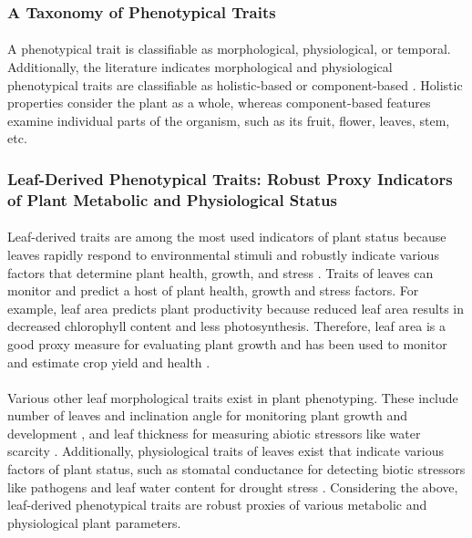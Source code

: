 \subsubsection{A Taxonomy of Phenotypical Traits}
\paragraph{}
A phenotypical trait is classifiable as morphological, physiological, or temporal. Additionally, the literature indicates morphological and physiological phenotypical traits are classifiable as holistic-based or component-based \cite{daschoudhuryLeveragingImageAnalysis2019}. Holistic properties consider the plant as a whole, whereas component-based features examine individual parts of the organism, such as its fruit, flower, leaves, stem, etc. 

\subsubsection{Leaf-Derived Phenotypical Traits: Robust Proxy Indicators of Plant Metabolic and Physiological Status}
\paragraph{}
Leaf-derived traits are among the most used indicators of plant status because leaves rapidly respond to environmental stimuli and robustly indicate various factors that determine plant health, growth, and stress \cite{zhangHighthroughputPhenotypingPlant2023}. Traits of leaves can monitor and predict a host of plant health, growth and stress factors. For example, leaf area predicts plant productivity because reduced leaf area results in decreased chlorophyll content and less photosynthesis. Therefore, leaf area is a good proxy measure for evaluating plant growth and has been used to monitor and estimate crop yield and health \cite{zhangLeafAreaIndex2021}.

\paragraph{}
Various other leaf morphological traits exist in plant phenotyping. These include number of leaves  and inclination angle for monitoring plant growth and development \cite{praveenkumarRosettePlantSegmentation2020, zhangHighthroughputPhenotypingPlant2023}, and leaf thickness for measuring abiotic stressors like water scarcity \cite{afzalLeafThicknessPredict2017}. Additionally, physiological traits of leaves exist that indicate various factors of plant status, such as stomatal conductance for detecting biotic stressors like pathogens \cite{ishimweApplicationsThermalImaging2014} and leaf water content for drought stress \cite{watanabeFundamentalStudyWater2022}. Considering the above, leaf-derived phenotypical traits are robust proxies of various metabolic and physiological plant parameters.

